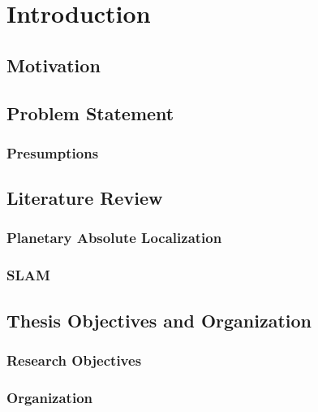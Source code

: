 \label{Chapter1}

\chapter{Introduction}

\section{Motivation}

\section{Problem Statement}

\subsection{Presumptions}

\section{Literature Review}

\subsection{Planetary Absolute Localization}

\subsection{SLAM}

\section{Thesis Objectives and Organization}

\subsection{Research Objectives}

\subsection{Organization}

